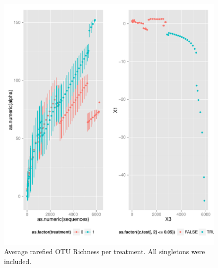 \documentclass[a4paper, 11]{article}\usepackage[]{graphicx}\usepackage[]{color}
\makeatletter
\def\maxwidth{ %
  \ifdim\Gin@nat@width>\linewidth
    \linewidth
  \else
    \Gin@nat@width
  \fi
}
\newenvironment{knitrout}{}{} %
\makeatother
\begin{document}
\begin{knitrout}
\color{fgcolor}\begin{figure}[H]
\includegraphics[width=\maxwidth]{figure/rarefact1a-1} \caption[Average rarefied OTU Richness per treatment]{Average rarefied OTU Richness per treatment. All singletons were included.}\label{fig:rarefact1a}
\end{figure}


\end{knitrout}
\end{document}
